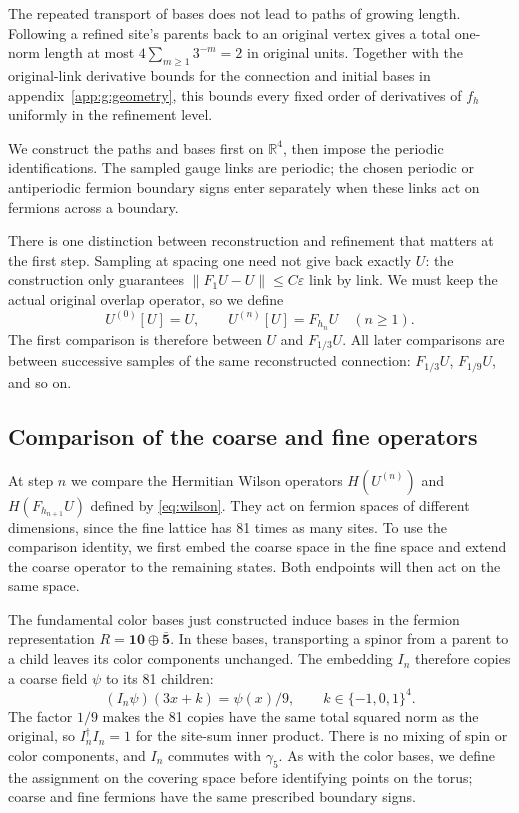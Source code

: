 \documentclass[11pt,a4paper]{article}
\theoremstyle{remark}
\newcommand{\eps}{\varepsilon}
\begin{document}
The repeated transport of bases does not lead to paths of growing length.
Following a refined site's parents back to an original vertex gives a
total one-norm length at most $4\sum_{m\ge1}3^{-m}=2$ in original units.
Together with the original-link derivative bounds for the connection and
initial bases in appendix~\ref{app:g:geometry}, this bounds every fixed
order of derivatives of $f_h$ uniformly in the refinement level.

We construct the paths and bases first on $\mathbb R^4$, then impose the
periodic identifications. The sampled gauge links are periodic; the
chosen periodic or antiperiodic fermion boundary signs enter separately
when these links act on fermions across a boundary.

There is one distinction between reconstruction and refinement that matters
at the first step. Sampling at spacing one need not give back exactly $U$:
the construction only guarantees $\|F_1U-U\|\le C\eps$ link by link.
We must keep the actual original overlap operator, so we define
\begin{equation}
 U^{(0)}[U]=U,\qquad
 U^{(n)}[U]=F_{h_n}U\quad(n\ge1).
 \label{eq:coarse-fields}
\end{equation}
The first comparison is therefore between $U$ and $F_{1/3}U$. All later
comparisons are between successive samples of the same reconstructed
connection: $F_{1/3}U$, $F_{1/9}U$, and so on.

\subsection{Comparison of the coarse and fine operators}

At step $n$ we compare the Hermitian Wilson operators
$H(U^{(n)})$ and $H(F_{h_{n+1}}U)$ defined by \eqref{eq:wilson}.
They act on fermion spaces of different dimensions, since the fine lattice
has 81 times as many sites. To use the comparison identity, we first embed
the coarse space in the fine space and extend the coarse operator to the
remaining states. Both endpoints will then act on the same space.

The fundamental color bases just constructed induce bases in the fermion
representation $R=\mathbf{10}\oplus\bar{\mathbf5}$. In these bases,
transporting a spinor from a parent to a child leaves its color components
unchanged. The embedding $I_n$ therefore copies a coarse field $\psi$ to
its 81 children:
\begin{equation}
 (I_n\psi)(3x+k)=\psi(x)/9,
 \qquad k\in\{-1,0,1\}^4.
 \label{eq:constant-inclusion}
\end{equation}
The factor $1/9$ makes the 81 copies have the same total squared norm as
the original, so $I_n^\dagger I_n=1$ for the site-sum inner product.
There is no mixing of spin or color components, and $I_n$ commutes with
$\gamma_5$. As with the color bases, we define the assignment on the
covering space before identifying points on the torus; coarse and fine
fermions have the same prescribed boundary signs.
\end{document}
